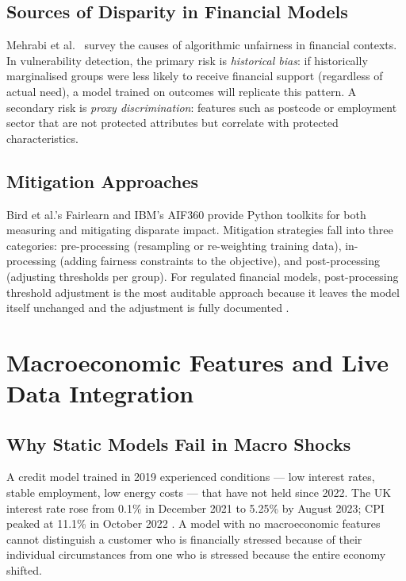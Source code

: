 \documentclass[12pt, a4paper]{article}
\begin{document}
\subsection{Sources of Disparity in Financial Models}

Mehrabi et al.\ \cite{mehrabi2021} survey the causes of algorithmic unfairness in
financial contexts.
In vulnerability detection, the primary risk is \emph{historical bias}: if
historically marginalised groups were less likely to receive financial support
(regardless of actual need), a model trained on outcomes will replicate this
pattern.
A secondary risk is \emph{proxy discrimination}: features such as postcode or
employment sector that are not protected attributes but correlate with protected
characteristics.

\subsection{Mitigation Approaches}

Bird et al.'s Fairlearn \cite{bird2020} and IBM's AIF360 \cite{bellamy2019} provide
Python toolkits for both measuring and mitigating disparate impact.
Mitigation strategies fall into three categories: pre-processing (resampling or
re-weighting training data), in-processing (adding fairness constraints to the
objective), and post-processing (adjusting thresholds per group).
For regulated financial models, post-processing threshold adjustment is the most
auditable approach because it leaves the model itself unchanged and the adjustment
is fully documented \cite{hardt2016}.

\section{Macroeconomic Features and Live Data Integration}

\subsection{Why Static Models Fail in Macro Shocks}

A credit model trained in 2019 experienced conditions --- low interest rates,
stable employment, low energy costs --- that have not held since 2022.
The UK interest rate rose from 0.1\% in December 2021 to 5.25\% by August 2023;
CPI peaked at 11.1\% in October 2022 \cite{ons2023}.
A model with no macroeconomic features cannot distinguish a customer who is
financially stressed because of their individual circumstances from one who is
stressed because the entire economy shifted.
\end{document}
